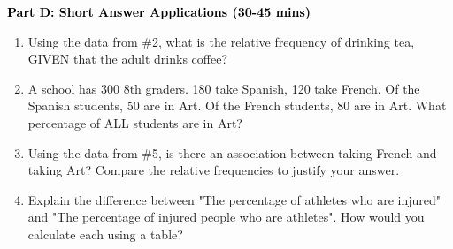 \documentclass[12pt, letterpaper, fleqn]{article}
\begin{document}
\newpage

\begin{tcolorbox}[colback=customteal!20]
\large\textcolor{black}{\textbf{Part D: Short Answer Applications (30-45 mins)}}
\end{tcolorbox}

\vspace{3mm}

\begin{enumerate}[itemsep=4.2cm, leftmargin=0.6cm, resume]
\item Using the data from \#2, what is the relative frequency of drinking tea, GIVEN that the adult drinks coffee?
\item A school has 300 8th graders. 180 take Spanish, 120 take French. Of the Spanish students, 50 are in Art. Of the French students, 80 are in Art. What percentage of ALL students are in Art?
\item Using the data from \#5, is there an association between taking French and taking Art? Compare the relative frequencies to justify your answer.
\item Explain the difference between "The percentage of athletes who are injured" and "The percentage of injured people who are athletes". How would you calculate each using a table?
\end{enumerate}
\end{document}
